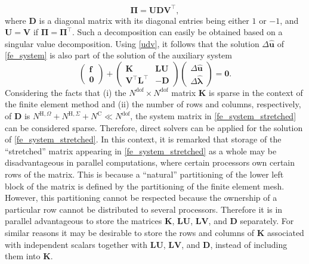 \documentclass[pdftex,a4paper,12pt,abstracton]{scrartcl}
\begin{document}
\begin{equation}
\boldsymbol{\Pi}=\boldsymbol{U} \boldsymbol{D} \boldsymbol{V}^\top,
\label{udv}
\end{equation}
where $\boldsymbol{D}$ is a diagonal matrix with its diagonal entries being either $1$ or $-1$, and $\boldsymbol{U}=\boldsymbol{V}$ if $\boldsymbol{\Pi}=\boldsymbol{\Pi}^\top$. Such a decomposition can easily be obtained based on a singular value decomposition. Using \eqref{udv}, it follows that the solution $\Delta\boldsymbol{\hat u}$ of \eqref{fe_system} is also part of the solution of the auxiliary system
\begin{equation}
 \begin{pmatrix}
   \boldsymbol{f} \\
   \boldsymbol{0}
 \end{pmatrix}
 +
 \begin{pmatrix}
   \boldsymbol{K} & \boldsymbol{L} \boldsymbol{U} \\
   \boldsymbol{V}^\top \boldsymbol{L}^\top & -\boldsymbol{D}
 \end{pmatrix}
 \begin{pmatrix}
   \Delta \boldsymbol{\hat u} \\
   \Delta \boldsymbol{\hat \lambda}
 \end{pmatrix}
 =
   \boldsymbol{0}.
 \label{fe_system_stretched}
\end{equation}
Considering the facts that (i) the $N^\mathrm{dof} \times N^\mathrm{dof}$ matrix $\boldsymbol{K}$ is sparse in the context of the finite element method and (ii) the number of rows and columns, respectively, of $\boldsymbol{D}$ is $N^{\mathrm{H},\Omega} + N^{\mathrm{H},\Sigma} + N^{\mathrm{C}} \ll N^\mathrm{dof}$, the system matrix in \eqref{fe_system_stretched} can be considered sparse. Therefore, direct solvers can be applied for the solution of \eqref{fe_system_stretched}. In this context, it is remarked that storage of the ``stretched'' matrix appearing in \eqref{fe_system_stretched} as a whole may be disadvantageous in parallel computations, where certain processors own certain rows of the matrix. This is because a ``natural'' partitioning of the lower left block of the matrix is defined by the partitioning of the finite element mesh. However, this partitioning cannot be respected because the ownership of a particular row cannot be distributed to several processors. Therefore it is in parallel advantageous to store the matrices $\boldsymbol{K}$, $\boldsymbol{L} \boldsymbol{U}$, $\boldsymbol{L} \boldsymbol{V}$, and $\boldsymbol{D}$ separately. For similar reasons it may be desirable to store the rows and columns of $\boldsymbol{K}$ associated with independent scalars together with $\boldsymbol{L} \boldsymbol{U}$, $\boldsymbol{L} \boldsymbol{V}$, and $\boldsymbol{D}$, instead of including them into $\boldsymbol{K}$.
\end{document}
